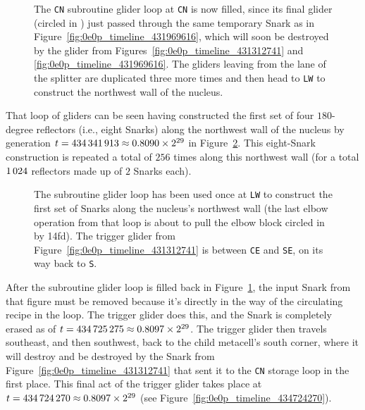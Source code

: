 \begin{figure}[!htb]
	\centering
	\caption{The \texttt{CN} subroutine glider loop at \texttt{CN} is now filled, since its final glider (circled in ) just passed through the same temporary Snark as in Figure~\ref{fig:0e0p_timeline_431969616}, which will soon be destroyed by the glider from Figures~\ref{fig:0e0p_timeline_431312741} and \ref{fig:0e0p_timeline_431969616}. The gliders leaving from the  lane of the splitter are duplicated three more times and then head to \texttt{LW} to construct the northwest wall of the nucleus.}
	\label{fig:0e0p_timeline_433582348}
\end{figure}

That loop of gliders can be seen having constructed the first set of four $180$-degree reflectors (i.e., eight Snarks) along the northwest wall of the nucleus by generation $t = 434{\,}341{\,}913 \approx 0.8090 \times 2^{29}$ in Figure~\ref{fig:0e0p_timeline_434341913}. This eight-Snark construction is repeated a total of $256$ times along this northwest wall (for a total $1{\,}024$ reflectors made up of $2$ Snarks each).

\begin{figure}[!htb]
	\centering
	\caption{The subroutine glider loop has been used once at \texttt{LW} to construct the first set of Snarks along the nucleus's northwest wall (the last elbow operation from that loop is about to pull the elbow block circled in  by 14fd). The trigger glider from Figure~\ref{fig:0e0p_timeline_431312741} is between \texttt{CE} and \texttt{SE}, on its way back to \texttt{S}.}
	\label{fig:0e0p_timeline_434341913}
\end{figure}


\clearpage%


After the subroutine glider loop is filled back in Figure~\ref{fig:0e0p_timeline_433582348}, the input Snark from that figure must be removed because it's directly in the way of the circulating recipe in the loop. The trigger glider does this, and the Snark is completely erased as of $t = 434{\,}725{\,}275 \approx 0.8097 \times 2^{29}$. The trigger glider then travels southeast, and then southwest, back to the child metacell's south corner, where it will destroy and be destroyed by the Snark from Figure~\ref{fig:0e0p_timeline_431312741} that sent it to the \texttt{CN} storage loop in the first place. This final act of the trigger glider takes place at $t = 434{\,}724{\,}270 \approx 0.8097 \times 2^{29}$ (see Figure~\ref{fig:0e0p_timeline_434724270}).


